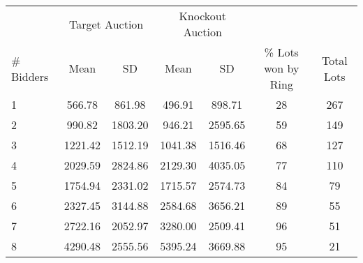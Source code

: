 \begin{tabular}{lcccccc}
\toprule
& \multicolumn{2}{c}{Target Auction} & \multicolumn{2}{c}{Knockout Auction} & & \\
\cmidrule(lr){2-3}\cmidrule(lr){4-5}
\# Bidders & Mean & SD & Mean & SD & \% Lots won by Ring & Total Lots \\ \midrule
1 & 566.78 & 861.98 & 496.91 & 898.71 & 28 & 267 \\
2 & 990.82 & 1803.20 & 946.21 & 2595.65 & 59 & 149 \\
3 & 1221.42 & 1512.19 & 1041.38 & 1516.46 & 68 & 127 \\
4 & 2029.59 & 2824.86 & 2129.30 & 4035.05 & 77 & 110 \\
5 & 1754.94 & 2331.02 & 1715.57 & 2574.73 & 84 & 79 \\
6 & 2327.45 & 3144.88 & 2584.68 & 3656.21 & 89 & 55 \\
7 & 2722.16 & 2052.97 & 3280.00 & 2509.41 & 96 & 51 \\
8 & 4290.48 & 2555.56 & 5395.24 & 3669.88 & 95 & 21 \\
\bottomrule
\end{tabular}

